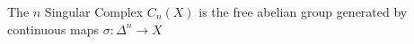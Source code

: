 The $n$ Singular Complex $C_n(X)$ is the free abelian group generated by continuous maps $\sigma: \Delta^n \to X$